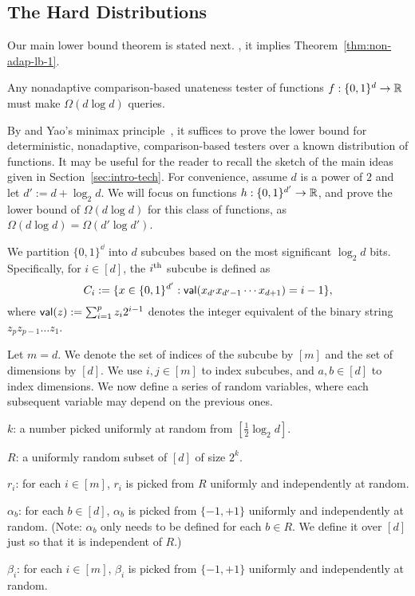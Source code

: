 \subsection{The Hard Distributions} \label{sec:hard-dist}
Our main lower bound theorem is stated next. , it implies Theorem~\ref{thm:non-adap-lb-1}.

\begin{theorem}\label{thm:non-adap-lb}
Any nonadaptive comparison-based unateness tester of functions $f:\{0,1\}^d\to {\mathbb R}$ must make $\Omega(d\log d)$ queries.
\end{theorem}

\noindent {}

By  and Yao's minimax principle~\cite{Yao77}, it suffices to prove
the lower bound for deterministic, nonadaptive, comparison-based testers over a known distribution of functions.
It may be useful for the reader to recall the  sketch of the main ideas given in Section~\ref{sec:intro-tech}.
For convenience, assume $d$ is a power of $2$ and let $d' := d+\log_2d$.
We will focus on functions $h:\{0,1\}^{d'} \to {\mathbb R}$,
and prove the lower bound of $\Omega(d \log d)$ for this class of functions,
as $\Omega(d \log d) = \Omega(d' \log d')$.


We partition $\{0,1\}^\dd$ into $d$ subcubes based on the most significant $\log_2 d$ bits.
Specifically, for $i \in [d]$, the ${i}^{\mathrm{th}}$ subcube is defined as
\[C_i := \{x\in \{0,1\}^{d'}: \mathsf{val}(x_{d'}x_{d'-1}\cdots x_{d+1}) = i - 1\},\]
where $\mathsf{val}(z) := \sum_{i = 1}^p z_i 2^{i-1}$ denotes the integer equivalent of the binary string $z_p z_{p-1} \ldots z_1$.

Let $m=d$. We denote the set of indices of the subcube by $[m]$ and the set of dimensions by $[d]$.
We use $i,j\in [m]$ to index subcubes,
and $a,b\in [d]$ to index dimensions.
We now define a series of random variables, where each subsequent variable may depend on the previous ones.
\begin{compactitem}
    \item $k$: a number picked uniformly at random from $\left[\frac{1}{2}\log_2 d \right]$.
    \item $R$: a uniformly random subset of $[d]$ of size $2^k$.
    \item $r_i$: for each $i \in [m]$, $r_i$ is picked from $R$ uniformly and independently at random.
    \item $\alpha_b$: for each $b \in [d]$, $\alpha_b$ is picked from $\{-1,+1\}$ uniformly and independently at random. (Note: $\alpha_b$ only needs to be defined for each $b \in R$. We define it over $[d]$ just so that it is independent of $R$.)
    \item $\beta_i$: for each $i \in [m]$, $\beta_i$ is picked from $\{-1,+1\}$ uniformly and independently at random.
\end{compactitem}

